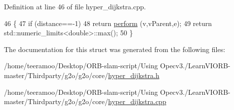 Definition at line 46 of file hyper\+\_\+dijkstra.\+cpp.


\begin{DoxyCode}
46                                                                                                            
                      \{
47     \textcolor{keywordflow}{if} (distance==-1)
48       \textcolor{keywordflow}{return} \hyperlink{structg2o_1_1HyperDijkstra_1_1TreeAction_aacd1280762e801f05b04874950cf052b}{perform} (v,vParent,e);
49     \textcolor{keywordflow}{return} std::numeric\_limits<double>::max();
50   \}
\end{DoxyCode}


The documentation for this struct was generated from the following files\+:\begin{DoxyCompactItemize}
\item 
/home/teeramoo/\+Desktop/\+O\+R\+B-\/slam-\/script/\+Using Opecv3./\+Learn\+V\+I\+O\+R\+B-\/master/\+Thirdparty/g2o/g2o/core/\hyperlink{hyper__dijkstra_8h}{hyper\+\_\+dijkstra.\+h}\item 
/home/teeramoo/\+Desktop/\+O\+R\+B-\/slam-\/script/\+Using Opecv3./\+Learn\+V\+I\+O\+R\+B-\/master/\+Thirdparty/g2o/g2o/core/\hyperlink{hyper__dijkstra_8cpp}{hyper\+\_\+dijkstra.\+cpp}\end{DoxyCompactItemize}
